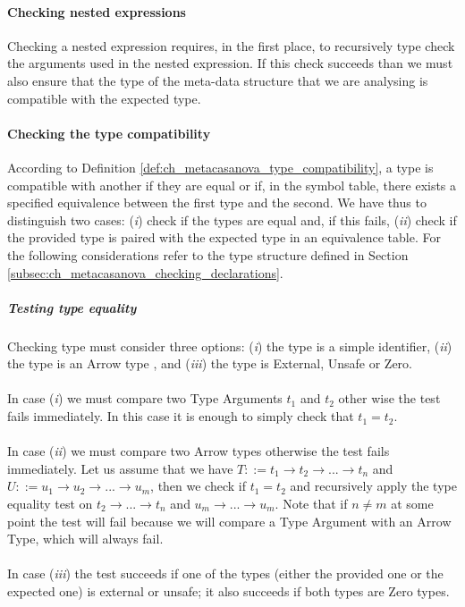 \paragraph{Checking nested expressions}
Checking a nested expression requires, in the first place, to recursively type check the arguments used in the nested expression. If this check succeeds than we must also ensure that the type of the meta-data structure that we are analysing is compatible with the expected type.

\paragraph{Checking the type compatibility}
According to Definition \ref{def:ch_metacasanova_type_compatibility}, a type is compatible with another if they are equal or if, in the symbol table, there exists a specified equivalence between the first type and the second. We have thus to distinguish two cases: (\textit{i}) check if the types are equal and, if this fails, (\textit{ii}) check if the provided type is paired with the expected type in an equivalence table. For the following considerations refer to the type structure defined in Section \ref{subsec:ch_metacasanova_checking_declarations}.

\subparagraph{Testing type equality}
Checking type must consider three options: (\textit{i}) the type is a simple identifier, (\textit{ii}) the type is an Arrow type , and (\textit{iii}) the type is External, Unsafe or Zero.\\\\
In case (\textit{i}) we must compare two Type Arguments $t_1$ and $t_2$ other wise the test fails immediately. In this case it is enough to simply check that $t_1 = t_2$.\\\\
In case (\textit{ii}) we must compare two Arrow types otherwise the test fails immediately. Let us assume that we have $T ::= t_1 \rightarrow t_2 \rightarrow ... \rightarrow t_n$ and $U ::= u_1 \rightarrow u_2 \rightarrow ... \rightarrow u_m$, then we check if $t_1 = t_2$ and recursively apply the type equality test on $t_2 \rightarrow ... \rightarrow t_n$ and $u_m \rightarrow ... \rightarrow u_m$. Note that if $n \neq m$ at some point the test will fail because we will compare a Type Argument with an Arrow Type, which will always fail.\\\\
In case (\textit{iii}) the test succeeds if one of the types (either the provided one or the expected one) is external or unsafe; it also succeeds if both types are Zero types.

